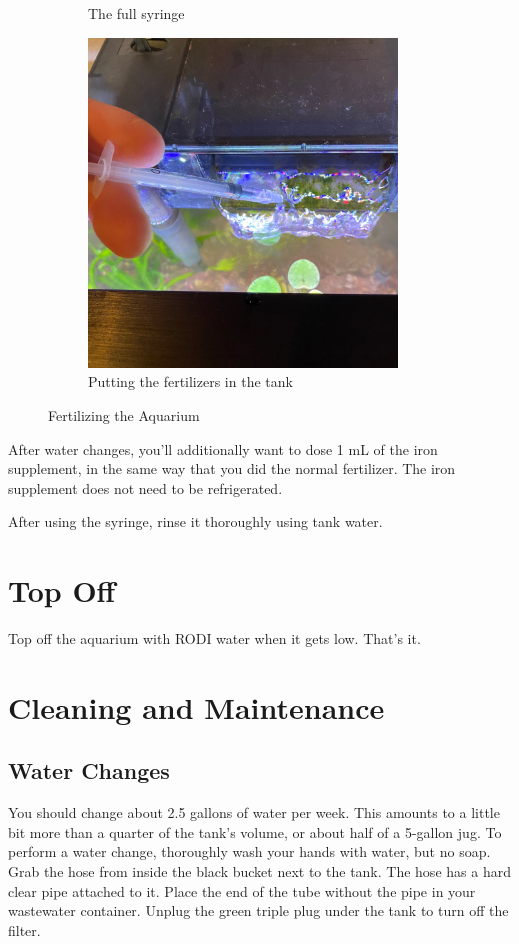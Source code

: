 \documentclass{report}
\begin{document}
\begin{figure}[H]
\begin{subfigure}{0.5\textwidth}
        \caption{The full syringe}
    \end{subfigure}%
    \begin{subfigure}{0.5\textwidth}
        \centering
        \includegraphics[width=0.9\textwidth]{FertInFilter.jpg}
        \caption{Putting the fertilizers in the tank}
    \end{subfigure}
    \caption{Fertilizing the Aquarium}
\end{figure}

After water changes, you'll additionally want to dose 1 mL of the iron supplement, in the same way that you did the normal
fertilizer. The iron supplement does not need to be refrigerated.

After using the syringe, rinse it thoroughly using tank water.

\section{Top Off}
Top off the aquarium with RODI water when it gets low. That's it.

\section{Cleaning and Maintenance}
\subsection{Water Changes}
You should change about 2.5 gallons of water per week. This amounts to a little bit more than a quarter of the tank's volume,
or about half of a 5-gallon jug. To perform a water change, thoroughly wash your hands with water, but no soap. Grab the 
hose from inside the black bucket next to the tank. The hose has a hard clear pipe attached to it. Place the end of the tube 
without the pipe in your wastewater container. Unplug the green triple plug under the tank to turn off the filter.
\end{document}
